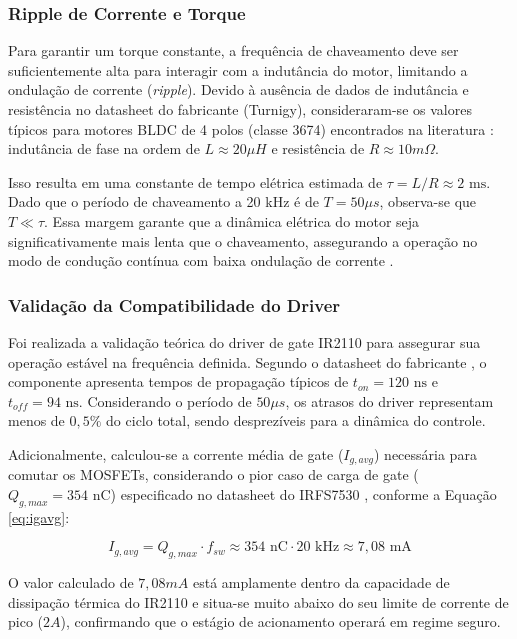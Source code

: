 \documentclass[12pt, a4paper, openright, oneside, brazilian]{abntex2}
\begin{document}
\subsubsection{Ripple de Corrente e Torque}
Para garantir um torque constante, a frequência de chaveamento deve ser suficientemente alta para interagir com a indutância do motor, limitando a ondulação de corrente (\textit{ripple}). Devido à ausência de dados de indutância e resistência no datasheet do fabricante (Turnigy), consideraram-se os valores típicos para motores BLDC de 4 polos (classe 3674) encontrados na literatura \cite{hanselman2003brushless}: indutância de fase na ordem de $L \approx 20 \mu H$ e resistência de $R \approx 10 m\Omega$.

Isso resulta em uma constante de tempo elétrica estimada de $\tau = L/R \approx 2 \text{ ms}$. Dado que o período de chaveamento a 20 kHz é de $T = 50 \mu s$, observa-se que $T \ll \tau$. Essa margem garante que a dinâmica elétrica do motor seja significativamente mais lenta que o chaveamento, assegurando a operação no modo de condução contínua com baixa ondulação de corrente \cite{hanselman2003brushless}.

\subsubsection{Validação da Compatibilidade do Driver}
Foi realizada a validação teórica do driver de gate IR2110 para assegurar sua operação estável na frequência definida. Segundo o datasheet do fabricante \cite{infineon2005}, o componente apresenta tempos de propagação típicos de $t_{on} = 120 \text{ ns}$ e $t_{off} = 94 \text{ ns}$. Considerando o período de $50 \mu s$, os atrasos do driver representam menos de $0,5\%$ do ciclo total, sendo desprezíveis para a dinâmica do controle.

Adicionalmente, calculou-se a corrente média de gate ($I_{g,avg}$) necessária para comutar os MOSFETs, considerando o pior caso de carga de gate ($Q_{g,max} = 354 \text{ nC}$) especificado no datasheet do IRFS7530 \cite{infineon7530}, conforme a Equação \ref{eq:igavg}:

\begin{equation} \label{eq:igavg}
I_{g,avg} = Q_{g,max} \cdot f_{sw} \approx 354 \text{ nC} \cdot 20 \text{ kHz} \approx 7,08 \text{ mA}
\end{equation}

O valor calculado de $7,08 mA$ está amplamente dentro da capacidade de dissipação térmica do IR2110 e situa-se muito abaixo do seu limite de corrente de pico ($2 A$), confirmando que o estágio de acionamento operará em regime seguro.
\end{document}
